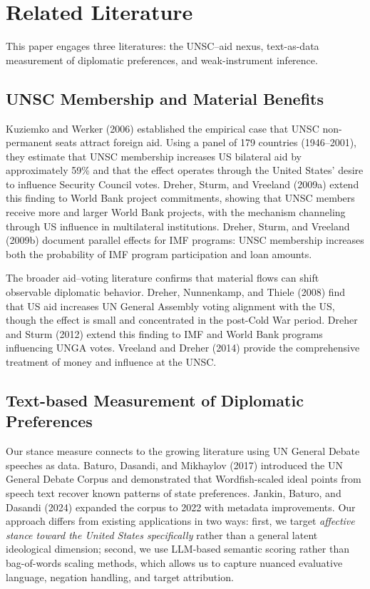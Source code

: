 \section{Related Literature}\label{sec:literature}

This paper engages three literatures: the UNSC--aid nexus, text-as-data measurement of diplomatic preferences, and weak-instrument inference.

\subsection{UNSC Membership and Material Benefits}

Kuziemko and Werker (2006) established the empirical case that UNSC non-permanent seats attract foreign aid. Using a panel of 179 countries (1946--2001), they estimate that UNSC membership increases US bilateral aid by approximately 59\% and that the effect operates through the United States' desire to influence Security Council votes. Dreher, Sturm, and Vreeland (2009a) extend this finding to World Bank project commitments, showing that UNSC members receive more and larger World Bank projects, with the mechanism channeling through US influence in multilateral institutions. Dreher, Sturm, and Vreeland (2009b) document parallel effects for IMF programs: UNSC membership increases both the probability of IMF program participation and loan amounts.

The broader aid--voting literature confirms that material flows can shift observable diplomatic behavior. Dreher, Nunnenkamp, and Thiele (2008) find that US aid increases UN General Assembly voting alignment with the US, though the effect is small and concentrated in the post-Cold War period. Dreher and Sturm (2012) extend this finding to IMF and World Bank programs influencing UNGA votes. Vreeland and Dreher (2014) provide the comprehensive treatment of money and influence at the UNSC.

\subsection{Text-based Measurement of Diplomatic Preferences}

Our stance measure connects to the growing literature using UN General Debate speeches as data. Baturo, Dasandi, and Mikhaylov (2017) introduced the UN General Debate Corpus and demonstrated that Wordfish-scaled ideal points from speech text recover known patterns of state preferences. Jankin, Baturo, and Dasandi (2024) expanded the corpus to 2022 with metadata improvements. Our approach differs from existing applications in two ways: first, we target \emph{affective stance toward the United States specifically} rather than a general latent ideological dimension; second, we use LLM-based semantic scoring rather than bag-of-words scaling methods, which allows us to capture nuanced evaluative language, negation handling, and target attribution.

